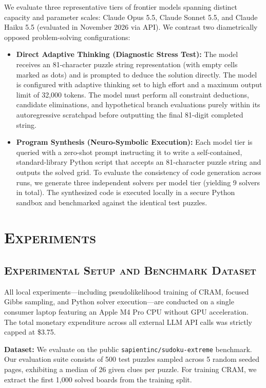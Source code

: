 \documentclass{article} %
\begin{document}
We evaluate three representative tiers of frontier models spanning distinct capacity and parameter scales: Claude Opus 5.5, Claude Sonnet 5.5, and Claude Haiku 5.5 (evaluated in November 2026 via API). We contrast two diametrically opposed problem-solving configurations:
\begin{itemize}
    \item \textbf{Direct Adaptive Thinking (Diagnostic Stress Test):} The model receives an 81-character puzzle string representation (with empty cells marked as dots) and is prompted to deduce the solution directly. The model is configured with adaptive thinking set to high effort and a maximum output limit of 32,000 tokens. The model must perform all constraint deductions, candidate eliminations, and hypothetical branch evaluations purely within its autoregressive scratchpad before outputting the final 81-digit completed string.
    \item \textbf{Program Synthesis (Neuro-Symbolic Execution):} Each model tier is queried with a zero-shot prompt instructing it to write a self-contained, standard-library Python script that accepts an 81-character puzzle string and outputs the solved grid. To evaluate the consistency of code generation across runs, we generate three independent solvers per model tier (yielding 9 solvers in total). The synthesized code is executed locally in a secure Python sandbox and benchmarked against the identical test puzzles.
\end{itemize}

\section{\textsc{Experiments}}
\label{sec:experiments}

\subsection{\textsc{Experimental Setup and Benchmark Dataset}}
\label{subsec:exp_setup}

All local experiments—including pseudolikelihood training of CRAM, focused Gibbs sampling, and Python solver execution—are conducted on a single consumer laptop featuring an Apple M4 Pro CPU without GPU acceleration. The total monetary expenditure across all external LLM API calls was strictly capped at \$3.75.

\textbf{Dataset:} We evaluate on the public \texttt{sapientinc/sudoku-extreme} benchmark. Our evaluation suite consists of 500 test puzzles sampled across 5 random seeded pages, exhibiting a median of 26 given clues per puzzle. For training CRAM, we extract the first 1,000 solved boards from the training split. 
\end{document}
